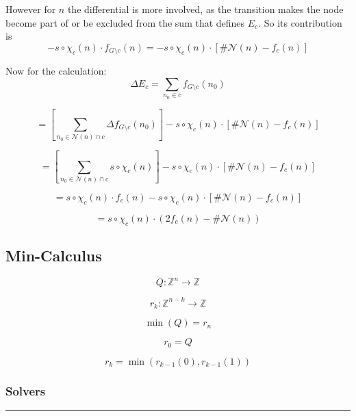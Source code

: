 \documentclass[
]{article}
\begin{document}
However for \(n\) the differential is more involved, as the transition
makes the node become part of or be excluded from the sum that defines
\(E_c\). So its contribution is \[
    -s\circ\chi_c(n) \cdot f_{G \setminus c}(n) = -s\circ\chi_c(n) \cdot [\#\mathcal{N}(n) - f_c(n)]
\]

Now for the calculation: \[
    \Delta E_c   = \sum_{n_0 \in c} f_{G \setminus c}(n_0)
\]

\[
            = \left[ \sum_{n_0 \in \mathcal{N}(n) \cap c} \Delta f_{G \setminus c}(n_0)\right] -s\circ\chi_c(n) \cdot [\#\mathcal{N}(n) - f_c(n)]
\]

\[
            = \left[ \sum_{n_0 \in \mathcal{N}(n) \cap c} s\circ\chi_c(n) \right] -s\circ\chi_c(n) \cdot [\#\mathcal{N}(n) - f_c(n)]
\]

\[
            = s\circ\chi_c(n) \cdot f_c(n) -s\circ\chi_c(n) \cdot [\#\mathcal{N}(n) - f_c(n)]
\]

\[
            = s\circ\chi_c(n) \cdot (2f_c(n) - \#\mathcal{N}(n))
\]

\hypertarget{min-calculus}{%
\subsection{Min-Calculus}\label{min-calculus}}

\[
    Q: \mathbb{Z}^n \rightarrow \mathbb{Z}
\]

\[
    r_k: \mathbb{Z}^{n-k} \rightarrow \mathbb{Z}
\]

\[
    \min(Q) = r_n
\]

\[
    r_0 = Q
\]

\[
    r_k = \min(r_{k-1}(0),r_{k-1}(1))
\]

\hypertarget{solvers}{%
\subsubsection{Solvers}\label{solvers}}

\begin{center}\rule{0.5\linewidth}{0.5pt}\end{center}
\end{document}

